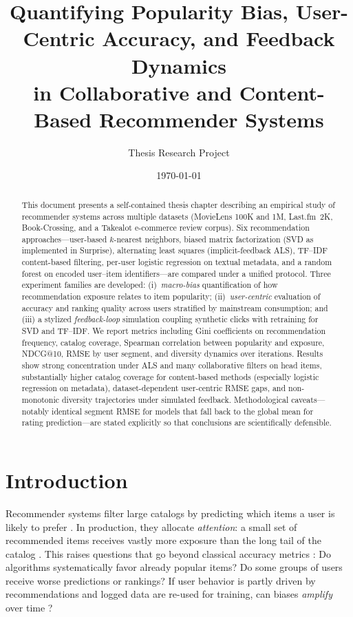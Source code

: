 \documentclass[11pt,a4paper,twoside,openright]{report}
\title{Quantifying Popularity Bias, User-Centric Accuracy, and Feedback Dynamics\\
  in Collaborative and Content-Based Recommender Systems}
\author{Thesis Research Project}
\date{\today}
\begin{document}
\maketitle

\begin{abstract}
This document presents a self-contained thesis chapter describing an empirical study of recommender systems across multiple datasets (MovieLens 100K and 1M, Last.fm~2K, Book-Crossing, and a Takealot e-commerce review corpus). Six recommendation approaches---user-based $k$-nearest neighbors, biased matrix factorization (SVD as implemented in Surprise), alternating least squares (implicit-feedback ALS), TF--IDF content-based filtering, per-user logistic regression on textual metadata, and a random forest on encoded user--item identifiers---are compared under a unified protocol. Three experiment families are developed: (i)~\emph{macro-bias} quantification of how recommendation exposure relates to item popularity; (ii)~\emph{user-centric} evaluation of accuracy and ranking quality across users stratified by mainstream consumption; and (iii) a stylized \emph{feedback-loop} simulation coupling synthetic clicks with retraining for SVD and TF--IDF. We report metrics including Gini coefficients on recommendation frequency, catalog coverage, Spearman correlation between popularity and exposure, NDCG@10, RMSE by user segment, and diversity dynamics over iterations. Results show strong concentration under ALS and many collaborative filters on head items, substantially higher catalog coverage for content-based methods (especially logistic regression on metadata), dataset-dependent user-centric RMSE gaps, and non-monotonic diversity trajectories under simulated feedback. Methodological caveats---notably identical segment RMSE for models that fall back to the global mean for rating prediction---are stated explicitly so that conclusions are scientifically defensible.
\end{abstract}

\tableofcontents
\clearpage

\chapter{Introduction}

Recommender systems filter large catalogs by predicting which items a user is likely to prefer \citep{adomavicius2005toward,ricci2015recommender}. In production, they allocate \emph{attention}: a small set of recommended items receives vastly more exposure than the long tail of the catalog \citep{anderson2004long}. This raises questions that go beyond classical accuracy metrics \citep{cremonesi2010accuracy}: Do algorithms systematically favor already popular items? Do some groups of users receive worse predictions or rankings? If user behavior is partly driven by recommendations and logged data are re-used for training, can biases \emph{amplify} over time \citep{chaney2018algorithmic,mansoury2020feedback,abdollahpouri2019managing}?
\end{document}
